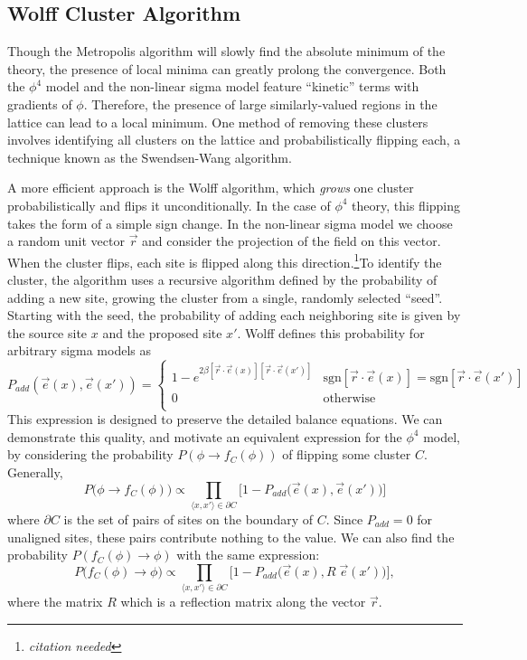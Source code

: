 \documentclass[12pt]{report}
\newcommand{\e}{\vec e}
\newcommand{\citeneeded}{\footnote{\textit{citation needed}}}
\begin{document}
\subsection{Wolff Cluster Algorithm}

Though the Metropolis algorithm will slowly find the absolute minimum of the theory, the presence of local minima can greatly prolong the convergence. Both the $\phi^4$ model and the non-linear sigma model feature ``kinetic'' terms with gradients of $\phi$. Therefore, the presence of large similarly-valued regions in the lattice can lead to a local minimum. One method of removing these clusters involves identifying all clusters on the lattice and probabilistically flipping each, a technique known as the Swendsen-Wang algorithm\cite{swendsen1987}. 

A more efficient approach is the Wolff algorithm\cite{wolff1989}, which \textit{grows} one cluster probabilistically and flips it unconditionally. In the case of $\phi^4$ theory, this flipping takes the form of a simple sign change. In the non-linear sigma model we choose a random unit vector $\vec r$ and consider the projection of the field on this vector. When the cluster flips, each site is flipped along this direction.\citeneeded To identify the cluster, the algorithm uses a recursive algorithm defined by the probability of adding a new site, growing the cluster from a single, randomly selected ``seed''. Starting with the seed, the probability of adding each neighboring site is given by the source site $x$ and the proposed site $x'$. Wolff defines this probability for arbitrary sigma models as 
\begin{equation}
    \label{eq:phi4 wolff padd}
    P_{add}(\e(x),\e(x')) = \begin{cases} 
        1 - e^{2\beta [\vec{r} \cdot \e(x)][\vec{r} \cdot \e(x')]} & \mathrm{sgn}[\vec{r}\cdot\e(x)]=\mathrm{sgn}[\vec{r}\cdot\e(x')]\\
        0 & \mathrm{otherwise} \\
   \end{cases}
\end{equation}
This expression is designed to preserve the detailed balance equations. We can demonstrate this quality, and motivate an equivalent expression for the $\phi^4$ model, by considering the probability $P(\phi\rightarrow f_C(\phi))$ of flipping some cluster $C$. Generally,
\begin{equation}
    P\big(\phi \rightarrow f_C\left(\phi\right)\big) \propto \prod_{\langle x,x'\rangle \in \partial C}  \Big[1 - P_{add}\big(\e(x),\e(x')\big)\Big]
\end{equation}
where $\partial C$ is the set of pairs of sites on the boundary of $C$. Since $P_{add}=0$ for unaligned sites, these pairs contribute nothing to the value. We can also find the probability $P(f_C(\phi) \rightarrow \phi)$ with the same expression:
\begin{equation}
P\big(f_C(\phi)\rightarrow \phi \big) \propto \prod_{\langle x,x'\rangle \in \partial C}  \Big[1 - P_{add}\big(\e(x),R\;\e(x')\big)\Big],
\end{equation}
where the matrix $R$ which is a reflection matrix along the vector $\vec{r}$.
\end{document}
